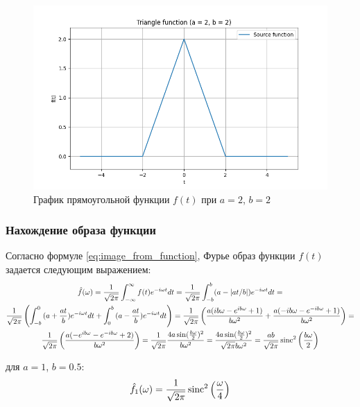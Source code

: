 \begin{figure}[ht!]
    \centering
    \includegraphics[width=\textwidth]{media/triangle_3.png}
    \caption{График прямоугольной функции $f(t)$ при $a = 2$, $b = 2$}
    \label{fig:triangle_3}
\end{figure}

\subsubsection{Нахождение образа функции}
Согласно формуле \eqref{eq:image_from_function}, Фурье образ функции $f(t)$ задается следующим выражением:
\begin{multline}
    \hat{f}(\omega) = \frac{1}{\sqrt{2\pi}} \int_{-\infty}^{\infty} f(t) e^{-i\omega t} dt = \frac{1}{\sqrt{2\pi}} \int_{-b}^{b} (a - |at / b|) e^{-i\omega t} dt = \\
    \frac{1}{\sqrt{2\pi}} \left(\int_{-b}^{0}{(a + \frac{at}{b}) e^{-i\omega t}} dt + \int_{0}^{b}{(a - \frac{at}{b}) e^{-i\omega t}} dt\right) =
    \frac{1}{\sqrt{2 \pi}} \left(\frac{a(ib\omega - e^{ib\omega} + 1)}{b \omega^2} + \frac{a(-ib\omega - e^{-ib\omega} + 1)}{b\omega^2} \right) = \\
    \frac{1}{\sqrt{2\pi}} \left( \frac{a (-e^{ib\omega} - e^{-ib\omega} + 2)} {b\omega^2} \right) = \frac{1}{\sqrt{2\pi}} \frac{4a \sin(\frac{b\omega}{2})^2}{b \omega^2}  = \frac{4a\sin(\frac{b\omega}{2})^2}{\sqrt{2\pi} b \omega^2} = \frac{ab}{\sqrt{2\pi}} \operatorname{sinc}^2\left(\frac{b\omega}{2}\right)
    \label{eq:truangle_image}
\end{multline}

для $a = 1$, $b = 0.5$:
\begin{equation}
    \hat{f_1}(\omega) = \frac{1}{\sqrt{2\pi}} \operatorname{sinc}^2\left(\frac{\omega}{4}\right)
\end{equation}

